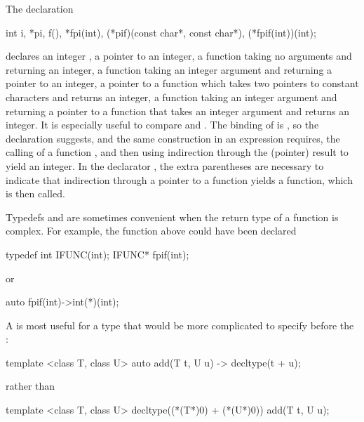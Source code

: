 \pnum
\begin{example}
The declaration

\begin{codeblock}
int i,
    *pi,
    f(),
    *fpi(int),
    (*pif)(const char*, const char*),
    (*fpif(int))(int);
\end{codeblock}

declares an integer
,
a pointer
to an integer,
a function
taking no arguments and returning an integer,
a function
taking an integer argument and returning a pointer to an integer,
a pointer
to a function which
takes two pointers to constant characters and returns an integer,
a function
taking an integer argument and returning a pointer to a function that takes an integer argument and returns an integer.
It is especially useful to compare
and
.
The binding of
is
,
so the declaration suggests,
and the same construction in an expression
requires, the calling of a function
,
and then using indirection through the (pointer) result
to yield an integer.
In the declarator
,
the extra parentheses are necessary to indicate that indirection through
a pointer to a function yields a function, which is then called.
\end{example}
\begin{note}
Typedefs and  are sometimes convenient when the return type of a function is complex.
For example,
the function
above could have been declared

\begin{codeblock}
typedef int  IFUNC(int);
IFUNC*  fpif(int);
\end{codeblock}

or

\begin{codeblock}
auto fpif(int)->int(*)(int);
\end{codeblock}

A  is most useful for a type that would be more complicated to specify before the :

\begin{codeblock}
template <class T, class U> auto add(T t, U u) -> decltype(t + u);
\end{codeblock}

rather than

\begin{codeblock}
template <class T, class U> decltype((*(T*)0) + (*(U*)0)) add(T t, U u);
\end{codeblock}
\end{note}

